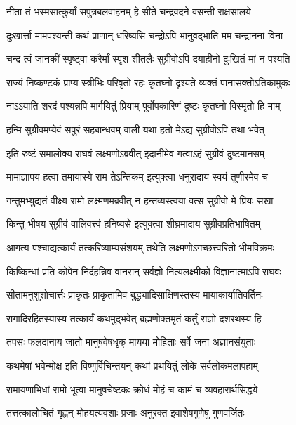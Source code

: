 \twolineshloka
{नीता तं भस्मसात्कुर्यां सपुत्रबलवाहनम्}
{हे सीते चन्द्रवदने वसन्ती राक्षसालये} %

\twolineshloka
{दुःखार्त्ता मामपश्यन्ती कथं प्राणान् धरिष्यसि}
{चन्द्रोऽपि भानुवद्भाति मम चन्द्राननां विना} %

\twolineshloka
{चन्द्र त्वं जानकीं स्पृष्ट्वा करैर्मां स्पृश शीतलैः}
{सुग्रीवोऽपि दयाहीनो दुःखितं मां न पश्यति} %

\twolineshloka
{राज्यं निष्कण्टकं प्राप्य स्त्रीभिः परिवृतो रहः}
{कृतघ्नो दृश्यते व्यक्तं पानासक्तोऽतिकामुकः} %

\twolineshloka
{नाऽऽयाति शरदं पश्यन्नपि मार्गयितुं प्रियाम्}
{पूर्वोपकारिणं दुष्टः कृतघ्नो विस्मृतो हि माम्} %

\twolineshloka
{हन्मि सुग्रीवमप्येवं सपुरं सहबान्धवम्}
{वाली यथा हतो मेऽद्य सुग्रीवोऽपि तथा भवेत्} %

\twolineshloka
{इति रुष्टं समालोक्य राघवं लक्ष्मणोऽब्रवीत्}
{इदानीमेव गत्वाऽहं सुग्रीवं दुष्टमानसम्} %

\twolineshloka
{मामाज्ञापय हत्वा तमायास्ये राम तेऽन्तिकम्}
{इत्युक्त्वा धनुरादाय स्वयं तूणीरमेव च} %

\twolineshloka
{गन्तुमभ्युद्यतं वीक्ष्य रामो लक्ष्मणमब्रवीत्}
{न हन्तव्यस्त्वया वत्स सुग्रीवो मे प्रियः सखा} %

\twolineshloka
{किन्तु भीषय सुग्रीवं वालिवत्त्वं हनिष्यसे}
{इत्युक्त्वा शीघ्रमादाय सुग्रीवप्रतिभाषितम्} %

\twolineshloka
{आगत्य पश्चाद्यत्कार्यं तत्करिष्याम्यसंशयम्}
{तथेति लक्ष्मणोऽगच्छत्त्वरितो भीमविक्रमः} %

\twolineshloka
{किष्किन्धां प्रति कोपेन निर्दहन्निव वानरान्}
{सर्वज्ञो नित्यलक्ष्मीको विज्ञानात्माऽपि राघवः} %

\twolineshloka
{सीतामनुशुशोचार्त्तः प्राकृतः प्राकृतामिव}
{बुद्ध्यादिसाक्षिणस्तस्य मायाकार्यातिवर्तिनः} %

\twolineshloka
{रागादिरहितस्यास्य तत्कार्यं कथमुद्भवेत्}
{ब्रह्मणोक्तमृतं कर्तुं राज्ञो दशरथस्य हि} %

\twolineshloka
{तपसः फलदानाय जातो मानुषवेषधृक्}
{मायया मोहिताः सर्वे जना अज्ञानसंयुताः} %

\twolineshloka
{कथमेषां भवेन्मोक्ष इति विष्णुर्विचिन्तयन्}
{कथां प्रथयितुं लोके सर्वलोकमलापहाम्} %

\twolineshloka
{रामायणाभिधां रामो भूत्वा मानुषचेष्टकः}
{क्रोधं मोहं च कामं च व्यवहारार्थसिद्धये} %

\twolineshloka
{तत्तत्कालोचितं गृह्णन् मोहयत्यवशाः प्रजाः}
{अनुरक्त इवाशेषगुणेषु गुणवर्जितः} %

